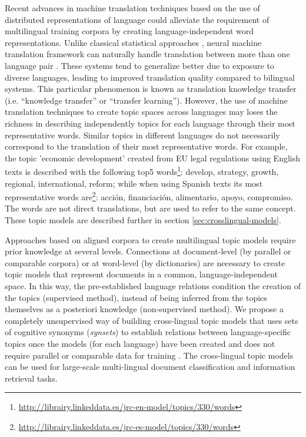 
Recent advances in machine translation techniques based on the use of distributed representations of language \citep{Dabre2020ASO} could alleviate the requirement of multilingual training corpora by creating language-independent word representations. Unlike classical statistical approaches \citep{nakov-ng-2009-improved}, neural machine translation framework can naturally handle translation between more than one language pair \citep{ChenLiu2018, neubig-hu-2018-rapid}. These systems tend to generalize better due to exposure to diverse languages, leading to improved translation quality compared to bilingual systems. This particular phenomenon is known as translation knowledge transfer \citep{Pan2010} (i.e. “knowledge transfer” or “transfer learning”). However, the use of machine translation techniques to create topic spaces across languages may loses the richness in describing independently topics for each language through their most representative words. Similar topics in different languages do not necessarily correspond to the translation of their most representative words. For example, the topic 'economic development' created from EU legal regulations using English texts is described with the following top5 words\footnote{\url{http://librairy.linkeddata.es/jrc-en-model/topics/330/words}}: develop, strategy, growth, regional, international, reform; while when using Spanish texts its most representative words are\footnote{\url{http://librairy.linkeddata.es/jrc-es-model/topics/330/words}}: acción, financiación, alimentario, apoyo, compromiso. The words are not direct translations, but are used to refer to the same concept. These topic models are described further in section \ref{sec:crosslingual-models}. 

Approaches based on aligned corpora to create multilingual topic models require prior knowledge at several levels. Connections at document-level (by parallel or comparable corpora) or at word-level (by dictionaries) are necessary to create topic models that represent documents in a common, language-independent space. In this way, the pre-established language relations condition the creation of the topics (supervised method), instead of being inferred from the topics themselves as a posteriori knowledge (non-supervised method). We propose a completely unsupervised way of building cross-lingual topic models that uses sets of cognitive synonyms (\textit{synsets}) to establish relations between language-specific topics once the models (for each language) have been created and does not require parallel or comparable data for training \citep{Badenes-Olmedo2019, Badenes-Olmedo2019b}. The cross-lingual topic models can be used for large-scale multi-lingual document classification and information retrieval tasks.

